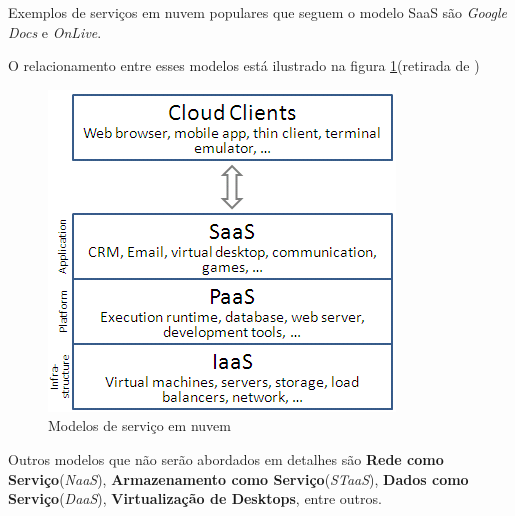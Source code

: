 \begin{itemize}
	Exemplos de serviços em nuvem populares que seguem o modelo SaaS são \textit{Google Docs} e \textit{OnLive}.
\end{itemize}
O relacionamento entre esses modelos está ilustrado na figura \ref{fig:CloudModels}(retirada de \cite{wikiCloud})\\

\begin{figure}[h]
	\centering
    \includegraphics[scale=0.50]{figuras/Cloud_computing_layers.png}
    \caption{Modelos de serviço em nuvem}
    \label{fig:CloudModels}
\end{figure}

Outros modelos que não serão abordados em detalhes são \textbf{Rede como Serviço}(\textit{NaaS}), \textbf{Armazenamento como Serviço}(\textit{STaaS}), \textbf{Dados como Serviço}(\textit{DaaS}), \textbf{Virtualização de Desktops}, entre outros.
